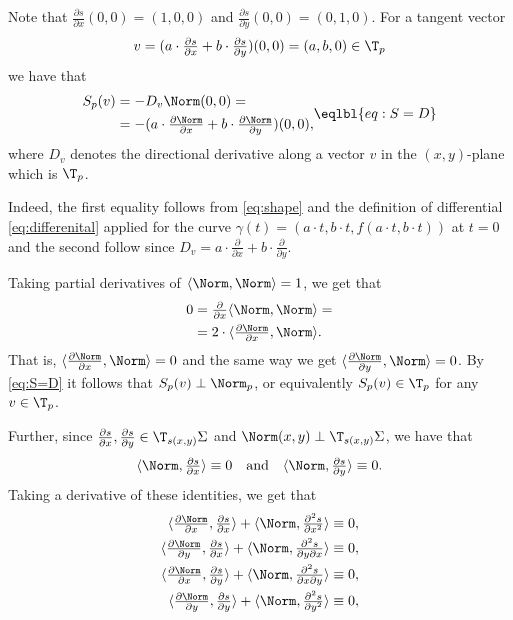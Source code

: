 Note that $\tfrac{\partial s}{\partial x}(0,0)=(1,0,0)$ and $\tfrac{\partial s}{\partial y}(0,0)=(0,1,0)$.
For a tangent vector 
\[v=(a\cdot\tfrac{\partial s}{\partial x}+b\cdot\tfrac{\partial s}{\partial y})(0,0) =(a,b,0)\in \T_p\]
we have that
\[
\begin{aligned}
S_p(v)&=-D_v\Norm(0,0)=
\\
&=-(a\cdot \tfrac{\partial \Norm}{\partial x}+b\cdot \tfrac{\partial \Norm}{\partial y})(0,0),
\end{aligned}
\eqlbl{eq:S=D}
\]
where $D_v$ denotes the directional derivative along a vector $v$ in the $(x,y)$-plane which is $\T_p$.

Indeed, the first equality follows from \ref{eq:shape} and the definition of differential \ref{eq:differenital} applied for the curve $\gamma(t)=(a\cdot t,b\cdot t, f(a\cdot t,b\cdot t))$ at $t=0$ and the second follow since
$D_v=a\cdot \tfrac{\partial }{\partial x}+b\cdot \tfrac{\partial }{\partial y}$.

Taking partial derivatives of $\langle\Norm,\Norm\rangle=1$, we get that 
\begin{align*}
0&=\tfrac{\partial}{\partial x} \langle\Norm,\Norm\rangle=
\\
&=2\cdot\langle\tfrac{\partial\Norm}{\partial x},\Norm\rangle.
\end{align*}
That is, $\langle\tfrac{\partial\Norm}{\partial x},\Norm\rangle=0$ and the same way we get $\langle\tfrac{\partial\Norm}{\partial y},\Norm\rangle=0$.
By \ref{eq:S=D} it follows that $S_p(v)\perp \Norm_p$, or equivalently $S_p(v)\in\T_p$ for any $v\in \T_p$.

Further, since $\tfrac{\partial s}{\partial x}, \tfrac{\partial s}{\partial y}\in\T_{s(x,y)}\Sigma$
and $\Norm(x,y)\perp\T_{s(x,y)}\Sigma$,
we have that
\[\langle \Norm,\tfrac{\partial s}{\partial x}\rangle\equiv 0
\quad\text{and}\quad
\langle \Norm,\tfrac{\partial s}{\partial y}\rangle\equiv 0.\]
Taking a derivative of these identities, we get that
\[\begin{aligned}
\langle \tfrac{\partial\Norm}{\partial x},\tfrac{\partial s}{\partial x}\rangle+\langle \Norm,\tfrac{\partial^2 s}{\partial x^2}\rangle&\equiv 0,
\\
\langle \tfrac{\partial\Norm}{\partial y},\tfrac{\partial s}{\partial x}\rangle+\langle \Norm,\tfrac{\partial^2 s}{\partial y\partial x}\rangle&\equiv 0,
\\
\langle \tfrac{\partial\Norm}{\partial x},\tfrac{\partial s}{\partial y}\rangle+\langle \Norm,\tfrac{\partial^2 s}{\partial x\partial y}\rangle&\equiv 0,
\\
\langle \tfrac{\partial\Norm}{\partial y},\tfrac{\partial s}{\partial y}\rangle+\langle \Norm,\tfrac{\partial^2 s}{\partial y^2}\rangle&\equiv 0,
\end{aligned}
\]

